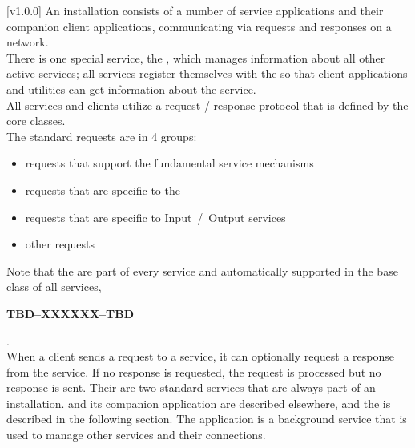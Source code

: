 [v1.0.0]
An \mplusm{} installation consists of a number of service applications and their companion
client applications, communicating via \mplusm{} requests and responses on a \yarp{}
network.\\

There is one special service, the , which
manages information about all other active services; all services register themselves
with the  so that client applications and
utilities can get information about the service.\\

All services and clients utilize a request / response protocol that is defined by the
\mplusm{}  core classes.\\

The standard requests are in 4 groups:
\begin{itemize}
\item \textbf{} requests that support the
fundamental \mplusm{} service mechanisms
\item \textbf{} requests
that are specific to the 
\item \textbf{} requests that
are specific to Input~/~Output services
\item \textbf{} other
requests
\end{itemize}
Note that the  are part of every service and
automatically supported in the base class of all services,
\begin{Large}\textbf{TBD--XXXXXX--TBD}\end{Large}.\\

When a client sends a request to a service, it can optionally request a response from the
service.
If no response is requested, the request is processed but no response is sent.
Their are two standard services that are always part of an \mplusm{} installation.
 and its companion application
 are described elsewhere, and the
 is described in the following section.
The  application is a background service
that is used to manage other services and their connections.\\

